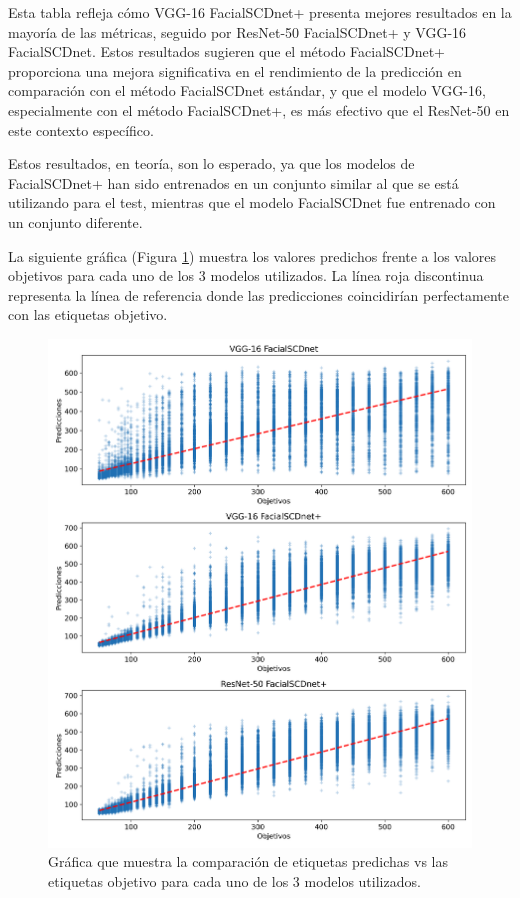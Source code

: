 Esta tabla refleja cómo VGG-16 FacialSCDnet+ presenta mejores resultados en la mayoría de las métricas, seguido por ResNet-50 FacialSCDnet+ y VGG-16 FacialSCDnet. Estos resultados sugieren que el método FacialSCDnet+ proporciona una mejora significativa en el rendimiento de la predicción en comparación con el método FacialSCDnet estándar, y que el modelo VGG-16, especialmente con el método FacialSCDnet+, es más efectivo que el ResNet-50 en este contexto específico.

Estos resultados, en teoría, son lo esperado, ya que los modelos de FacialSCDnet+ han sido entrenados en un conjunto similar al que se está utilizando para el test, mientras que el modelo FacialSCDnet fue entrenado con un conjunto diferente.

La siguiente gráfica (Figura \ref{fig32}) muestra los valores predichos frente a los valores objetivos para cada uno de los 3 modelos utilizados. La línea roja discontinua representa la línea de referencia donde las predicciones coincidirían perfectamente con las etiquetas objetivo. 

\begin{figure}[h]
	\centering
	\includegraphics[width=\textwidth]{imagenes/cap5/comp_etiquetas_own.png}
	\caption[Comparación etiquetas test FacialSCDnet+.]{Gráfica que muestra la comparación de etiquetas predichas vs las etiquetas objetivo para cada uno de los 3 modelos utilizados.}
	\label{fig32}
\end{figure}

